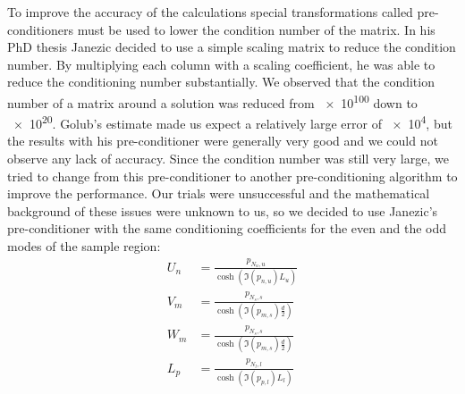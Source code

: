 To improve the accuracy of the calculations special transformations called pre-conditioners must be used to lower the condition number of the matrix. In his PhD thesis Janezic decided to use a simple scaling matrix to reduce the condition number. By multiplying each column with a scaling coefficient, he was able to reduce the conditioning number substantially. We observed that the condition number of a matrix around a solution was reduced from \num{e100} down to \num{e20}. Golub's estimate made us expect a relatively large error of \num{e4}, but the results with his pre-conditioner were generally very good and we could not observe any lack of accuracy. Since the condition number was still very large, we tried to change from this pre-conditioner to another pre-conditioning algorithm to improve the performance. Our trials were unsuccessful and the mathematical background of these issues were unknown to us, so we decided to use Janezic's pre-conditioner with the same conditioning coefficients for the even and the odd modes of the sample region:
\begin{align}
U_n &= \frac{p_{N_u,u}}{\cosh(\Im(p_{n,u})L_u)}\\
V_m &= \frac{p_{N_s,s}}{\cosh(\Im(p_{m,s})\frac{d}{2})}\\
W_m &= \frac{p_{N_s,s}}{\cosh(\Im(p_{m,s})\frac{d}{2})}\\
L_p &= \frac{p_{N_l,l}}{\cosh(\Im(p_{p,l})L_l)}
\end{align}
